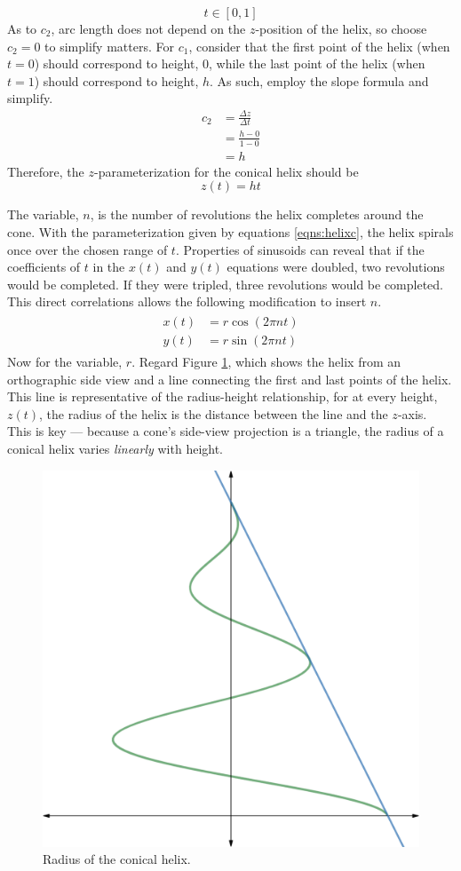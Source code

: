 \documentclass{article}
\begin{document}
\begin{equation}\label{eqn:int}
    t\in[0,1]
\end{equation}
As to $c_2$, arc length does not depend on the $z$-position of the helix, so choose $c_2=0$ to simplify matters. For $c_1$, consider that the first point of the helix (when $t=0$) should correspond to height, $0$, while the last point of the helix (when $t=1$) should correspond to height, $h$. As such, employ the slope formula and simplify.
\begin{align*}
    c_2 &= \frac{\Delta z}{\Delta t}\\
    &= \frac{h-0}{1-0}\\
    &= h
\end{align*}
Therefore, the $z$-parameterization for the conical helix should be
\begin{equation}\label{eqn:z}
    z(t)=ht
\end{equation}\par
The variable, $n$, is the number of revolutions the helix completes around the cone. With the parameterization given by equations \ref{eqns:helixc}, the helix spirals once over the chosen range of $t$. Properties of sinusoids can reveal that if the coefficients of $t$ in the $x(t)$ and $y(t)$ equations were doubled, two revolutions would be completed. If they were tripled, three revolutions would be completed. This direct correlations allows the following modification to insert $n$.
\begin{align}\label{eqns:xy}
    \begin{split}
        x(t) &= r\cos(2\pi nt)\\
        y(t) &= r\sin(2\pi nt)
    \end{split}
\end{align}
Now for the variable, $r$. Regard Figure \ref{fig:coneside}, which shows the helix from an orthographic side view and a line connecting the first and last points of the helix. This line is representative of the radius-height relationship, for at every height, $z(t)$, the radius of the helix is the distance between the line and the $z$-axis. This is key --- because a cone's side-view projection is a triangle, the radius of a conical helix varies \emph{linearly} with height.

\begin{figure}[h!]
    \centering
    \includegraphics[width=0.4\linewidth]{Blender/ConeSide-f.png}
    \caption{Radius of the conical helix.}
    \label{fig:coneside}
\end{figure}
\end{document}

